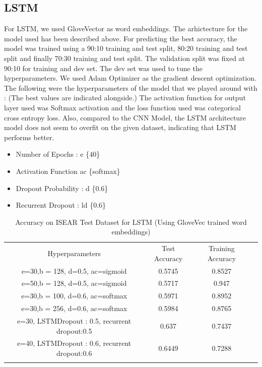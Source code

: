 \documentclass[conference]{IEEEtran}
\numberwithin{equation}{section}
\numberwithin{figure}{section}
\numberwithin{table}{section}
\begin{document}
\subsection{LSTM}
For LSTM, we used GloveVector as word embeddings. The arhictecture for the model used has been described above. For predicting the best accuracy, the model was trained using a 90:10 training and test split, 80:20 training and test split and finally 70:30 training and test split. The validation split was fixed at 90:10 for training and dev set. The dev set was used to tune the hyperparameters. We used Adam Optimizer as the gradient descent optimization. The following were the hyperparameters of the model that we played around with : (The best values are indicated alongside.) The activation function for output layer used was Softmax activation and the loss function used was categorical cross entropy loss. Also, compared to the CNN Model, the LSTM architecture model does not seem to overfit on the given dataset, indicating that LSTM performs better.
\begin{itemize}
\item Number of Epochs : e  \{40\}
\item Activation Function ac    \{softmax\}
\item Dropout Probability : d \{0.6\}
\item Recurrent Dropout : ld \{0.6\}
\end{itemize}

\begin{table}[!htb]
 \centering
 \caption{Accuracy on ISEAR Test Dataset for LSTM (Using GloveVec trained word embeddings)}
 \label{tab_cnn}
\begin{tabular}{ c c c c } 
    \noalign{\smallskip}\hline\noalign{\smallskip}
	Hyperparameters & Test Accuracy & Training Accuracy \\
       \noalign{\smallskip}\hline\noalign{\smallskip}
	e=30,b = 128, d=0.5, ac=sigmoid  & 0.5745 & 0.8527\\
	e=50,b = 128, d=0.5, ac=sigmoid  & 0.5717 & 0.947\\
	e=30,b = 100, d=0.6, ac=softmax  & 0.5971 & 0.8952\\
	e=30,b = 256, d=0.6, ac=softmax  & 0.5984 & 0.8765\\
	e=30, LSTMDropout : 0.5, recurrent dropout:0.5    & 0.637 & 0.7437\\
	e=40, LSTMDropout : 0.6, recurrent dropout:0.6   & 0.6449 & 0.7288 \\
    \noalign{\smallskip}\hline
  \end{tabular} 
\end{table}
\end{document}
